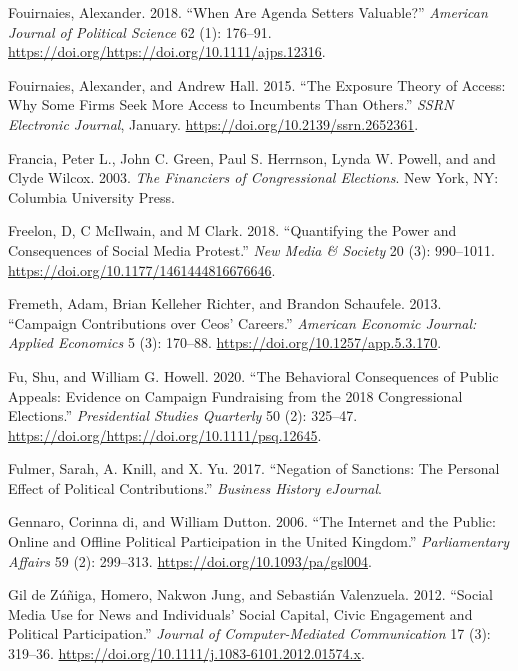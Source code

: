 \documentclass[12pt,]{article}
\begin{document}
\leavevmode\hypertarget{ref-fouirnaies2018}{}%
Fouirnaies, Alexander. 2018. ``When Are Agenda Setters Valuable?''
\emph{American Journal of Political Science} 62 (1): 176--91.
\url{https://doi.org/https://doi.org/10.1111/ajps.12316}.

\leavevmode\hypertarget{ref-fouirnaies2015}{}%
Fouirnaies, Alexander, and Andrew Hall. 2015. ``The Exposure Theory of
Access: Why Some Firms Seek More Access to Incumbents Than Others.''
\emph{SSRN Electronic Journal}, January.
\url{https://doi.org/10.2139/ssrn.2652361}.

\leavevmode\hypertarget{ref-francia2003}{}%
Francia, Peter L., John C. Green, Paul S. Herrnson, Lynda W. Powell, and
and Clyde Wilcox. 2003. \emph{The Financiers of Congressional
Elections}. New York, NY: Columbia University Press.

\leavevmode\hypertarget{ref-freelon2018}{}%
Freelon, D, C McIlwain, and M Clark. 2018. ``Quantifying the Power and
Consequences of Social Media Protest.'' \emph{New Media \& Society} 20
(3): 990--1011. \url{https://doi.org/10.1177/1461444816676646}.

\leavevmode\hypertarget{ref-fremeth2013}{}%
Fremeth, Adam, Brian Kelleher Richter, and Brandon Schaufele. 2013.
``Campaign Contributions over Ceos' Careers.'' \emph{American Economic
Journal: Applied Economics} 5 (3): 170--88.
\url{https://doi.org/10.1257/app.5.3.170}.

\leavevmode\hypertarget{ref-fu2020}{}%
Fu, Shu, and William G. Howell. 2020. ``The Behavioral Consequences of
Public Appeals: Evidence on Campaign Fundraising from the 2018
Congressional Elections.'' \emph{Presidential Studies Quarterly} 50 (2):
325--47. \url{https://doi.org/https://doi.org/10.1111/psq.12645}.

\leavevmode\hypertarget{ref-fulmer2017}{}%
Fulmer, Sarah, A. Knill, and X. Yu. 2017. ``Negation of Sanctions: The
Personal Effect of Political Contributions.'' \emph{Business History
eJournal}.

\leavevmode\hypertarget{ref-degennaro2006}{}%
Gennaro, Corinna di, and William Dutton. 2006. ``The Internet and the
Public: Online and Offline Political Participation in the United
Kingdom.'' \emph{Parliamentary Affairs} 59 (2): 299--313.
\url{https://doi.org/10.1093/pa/gsl004}.

\leavevmode\hypertarget{ref-zuniga2012}{}%
Gil de Zúñiga, Homero, Nakwon Jung, and Sebastián Valenzuela. 2012.
``Social Media Use for News and Individuals' Social Capital, Civic
Engagement and Political Participation.'' \emph{Journal of
Computer-Mediated Communication} 17 (3): 319--36.
\url{https://doi.org/10.1111/j.1083-6101.2012.01574.x}.
\end{document}
